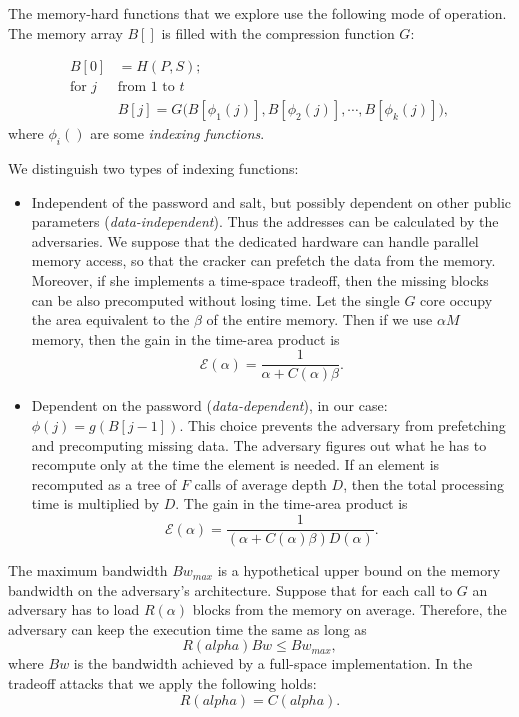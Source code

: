\documentclass[a4paper]{article}
\begin{document}
 The memory-hard functions that we explore use the following mode of operation. The memory array $B[]$ is filled with the   compression function $G$:

 \begin{equation}\label{eq:class}
\begin{array}{rl}
B[0] &= H(P,S);\\
\text{for $j$ }&\text{from 1  to } t\\
  &B[j] = G \bigl(B[\phi_1(j)] ,  B[\phi_2(j)] ,\cdots , B[\phi_k(j)]\bigr),
\end{array}
\end{equation}
where $\phi_i()$ are some \emph{indexing functions}.


We distinguish two types of indexing functions:
\begin{itemize}
  \item Independent of the password and salt, but possibly dependent on other public parameters (\emph{data-independent}). Thus the addresses can be calculated by the adversaries. We suppose that the dedicated hardware can handle parallel memory access, so that the  cracker can prefetch the data from the memory. Moreover, if she implements a time-space tradeoff, then the missing blocks can be also precomputed without losing time. Let the single $G$ core occupy the area equivalent to the $\beta$ of the entire memory. Then if we use $\alpha M$ memory, then the  gain in the time-area product is
  $$
  \mathcal{E}(\alpha) = \frac{1}{\alpha + C(\alpha)\beta}.
  $$
  \item Dependent on the password (\emph{data-dependent}), in our case: $\phi(j) = g(B[j-1])$. This choice prevents the adversary from prefetching and precomputing missing data. The adversary figures out what he has to recompute only at the time the element is needed. If an element is recomputed as a tree of $F$ calls of average depth $D$, then the total processing time is multiplied by $D$. The   gain in the time-area product is
  $$
  \mathcal{E}(\alpha) = \frac{1}{(\alpha + C(\alpha)\beta)D(\alpha)}.
  $$
\end{itemize}


 The maximum bandwidth $Bw_{max}$ is a hypothetical upper bound on the memory bandwidth on the adversary's architecture. Suppose that for each call to $G$ an adversary has to load
  $R(\alpha)$ blocks from the memory on average. Therefore,  the adversary can keep the execution time the same as long as
 $$
 R(alpha) Bw \leq Bw_{max},
 $$
 where $Bw$ is the bandwidth achieved by a full-space implementation. In the tradeoff attacks that we apply the following holds:
   $$
   R(alpha)  = C(alpha).
   $$
\end{document}
